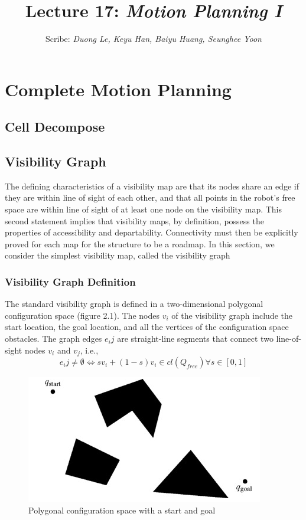 \documentclass[11pt]{article}
\title{Lecture 17: \it{Motion Planning I}}
\author{Scribe:  \it{Duong Le, Keyu Han, Baiyu Huang, Seunghee Yoon}}
\date{}
\begin{document}
\maketitle
\thispagestyle{fancy}
\section{Complete Motion Planning}
\subsection{Cell Decompose}
\subsection{Visibility Graph}

The defining characteristics of a visibility map are that its nodes share an edge if they are within line of sight of each other, and that all points in the robot's free space are within line of sight of at least one node on the visibility map. This second statement implies that visibility maps, by definition, possess the properties of accessibility and departability. Connectivity must then be explicitly proved for each map for the structure to be a roadmap. In this section, we consider the simplest visibility map, called the visibility graph

\subsubsection{Visibility Graph Definition}


The standard visibility graph is defined in a two-dimensional polygonal configuration space (figure 2.1). The nodes $v_i$ of the visibility graph include the start location, the goal location, and all the vertices of the configuration space obstacles. The graph edges $e_ij$ are straight-line segments that connect two line-of-sight nodes $v_i$ and $v_j$, i.e.,
$$e_ij \ne \emptyset \Longleftrightarrow sv_i + (1-s)v_i \in cl(Q_{free})   \forall s \in [0,1] $$
\begin{figure}[h]
\centering
\includegraphics{imgs/Polygonal_configuration_space.png}
\caption{Polygonal configuration space with a start and goal}
\end{figure}
\end{document}
